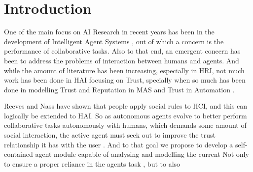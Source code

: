 \section{Introduction}
\label{sec:Introduction}

One of the main focus on \ac{AI} Research in recent years has been in the development of Intelligent Agent Systems \cite{Russell2009a}, out of which a concern is the performance of collaborative tasks\cite{Grosz1996, Allen2002, Allen2007}. Also to that end, an emergent concern has been to address the problems of interaction between humans and agents\cite{Bradshaw2011}. And while the amount of literature has been increasing, especially in \ac{HRI}\cite{Goodrich2007}, not much work has been done in \ac{HAI} focusing on Trust, specially when so much has been done in modelling Trust and Reputation in \ac{MAS}\cite{Granatyr2015} and Trust in Automation \cite{Lee1992, Jones1997, Lee2004}.

Reeves and Nass have shown that people apply social rules to \ac{HCI}, and this can logically be extended to \ac{HAI}\cite{Reeves1998a}. So as autonomous agents evolve to better perform collaborative tasks autonomously with humans, which demands some amount of social interaction, the active agent must seek out to improve the trust relationship it has with the user \cite{Lashkari1994}. And to that goal we propose to develop a self-contained agent module capable of analysing and modelling the current   Not only to ensure a proper reliance in the agents task \cite{Lee2004}, but to also 


